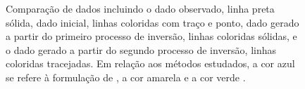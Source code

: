 \begin{figure}[H]
	\centering
	
	\caption{Comparação de dados incluindo o dado observado, linha preta sólida, dado inicial, linhas coloridas com traço e ponto, dado gerado a partir do primeiro processo de inversão, linhas coloridas sólidas, e o dado gerado a partir do segundo processo de inversão, linhas coloridas tracejadas. Em relação aos métodos estudados, a cor azul se refere à formulação de , a cor amarela  e a cor verde .}
	\label{fig:zoom_out}
\end{figure}

